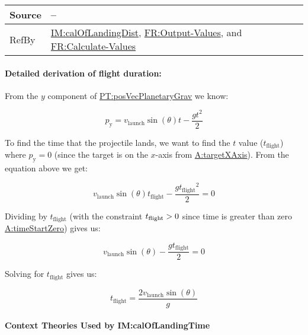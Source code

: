 \documentclass[12pt]{article}
\newcommand{\gt}{\ensuremath >}
\begin{document}
\begin{minipage}{\textwidth}
\begin{tabular}{>{\raggedright}p{}>{\raggedright\arraybackslash}p{}}
\\ \midrule
Source & --
         
\\ \midrule
RefBy & \hyperref[IM:calOfLandingDist]{IM:calOfLandingDist}, \hyperref[outputValues]{FR:Output-Values}, and \hyperref[calcValues]{FR:Calculate-Values}
        
\\ \bottomrule
\end{tabular}
\end{minipage}

\paragraph{Detailed derivation of flight duration:}
\label{IM:calOfLandingTimeDeriv}

From the $y$ component of \hyperref[PT:posVecPlanetaryGrav]{PT:posVecPlanetaryGrav} we know:

\begin{displaymath}
p_\text{y} = v_\text{launch} \sin (\theta) t - \frac{g t^2}{2}
\end{displaymath}

To find the time that the projectile lands, we want to find the $t$ value
(${t_{\text{flight}}}$) where ${p_{\text{y}}}=0$ (since the target is on the
$x$-axis from \hyperref[targetXAxis]{A:targetXAxis}). From the equation above we
get:

\begin{displaymath}
{{v_{\text{launch}}}} \sin (\theta) {t_{\text{flight}}}-\frac{g {t_{\text{flight}}}^{2}}{2}=0
\end{displaymath}

Dividing by ${t_{\text{flight}}}$ (with the constraint ${t_{\text{flight}}}\gt{}0$ since time is greater than zero \hyperref[timeStartZero]{A:timeStartZero}) gives us:

\begin{displaymath}
{{v_{\text{launch}}}} \sin (\theta) - \frac{g {t_{\text{flight}}}}{2}=0
\end{displaymath}

Solving for ${t_{\text{flight}}}$ gives us:

\begin{displaymath}
{t_{\text{flight}}}=\frac{2 {v_{\text{launch}}} \sin\left(θ\right)}{g}
\end{displaymath}
~\\

\noindent \textbf{Context Theories Used by IM:calOfLandingTime}
\end{document}
